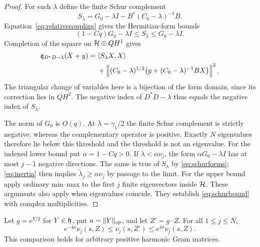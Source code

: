 \begin{proof}
For such $\lambda$ define the finite Schur complement
\begin{equation}\label{eq:schur}
S_\lambda=G_0-\lambda I-B^*(C_0-\lambda)^{-1}B.
\end{equation}
Equation~\eqref{eq:relativecoupling} gives the Hermitian-form bounds
\begin{equation}\label{eq:schurforms}
(1-Cq)G_0-\lambda I\le S_\lambda\le G_0-\lambda I.
\end{equation}
Completion of the square on $\mathcal H\oplus QH^1$ gives
\begin{align}
\mathfrak q_{D^*D-\lambda}(X+y)
={}&\langle S_\lambda X,X\rangle\notag\\
&+\left\|(C_0-\lambda)^{1/2}
\bigl(y+(C_0-\lambda)^{-1}BX\bigr)\right\|^2.\label{eq:inertia}
\end{align}
The triangular change of variables here is a bijection of the
form domain, since its correction lies in $QH^2$. The negative
index of $D^*D-\lambda$ thus equals the negative index of
$S_\lambda$.

The norm of $G_0$ is $O(q)$. At $\lambda=\gamma_1/2$ the
finite Schur complement is strictly negative, whereas the
complementary operator is positive. Exactly $N$ eigenvalues
therefore lie below this threshold and the threshold is not an
eigenvalue. For the indexed lower bound put $\alpha=1-Cq>0$.
If $\lambda<\alpha\nu_j$, the form $\alpha G_0-\lambda I$
has at most $j-1$ negative directions. The same is true of
$S_\lambda$ by \eqref{eq:schurforms}; \eqref{eq:inertia}
then implies $\widetilde\lambda_j\ge\alpha\nu_j$ by passage
to the limit. For the upper bound apply ordinary min--max to
the first $j$ finite eigenvectors inside $\mathcal H$.
These arguments also apply when eigenvalues coincide. They
establish \eqref{eq:schurbound} with complex multiplicities.
\end{proof}

\begin{lemma}\label{lem:gaugespectrum}
Let $g=e^{Y/2}$ for $Y\in\mathfrak h$, put $a=\|Y\|_{\mathrm{op}}$, and let
$Z'=g\cdot Z$. For all $1\le j\le N$,
\begin{equation}\label{eq:gaugecomparison}
e^{-4a}\nu_j(s,Z)\le\nu_j(s,Z')\le e^{4a}\nu_j(s,Z).
\end{equation}
This comparison holds for arbitrary positive harmonic Gram matrices.
\end{lemma}

